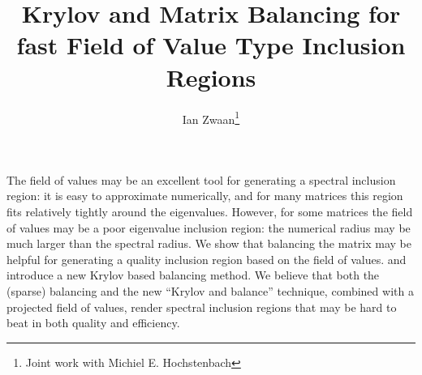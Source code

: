 \documentclass{article}
\title{Krylov and Matrix Balancing for fast Field of Value Type Inclusion Regions}
\author{Ian Zwaan\thanks{Joint work with Michiel E. Hochstenbach}}
\affil{PhD student at TU/e}
\date{}
\begin{document}
\maketitle
\setcounter{page}{7}
\vspace{-1cm}
The field of values may be an excellent tool for generating a spectral
inclusion region: it is easy to approximate numerically, and for many
matrices this region fits relatively tightly around the eigenvalues.
However, for some matrices the field of values may be a poor eigenvalue
inclusion region: the numerical radius may be much larger than the
spectral radius. We show that balancing the matrix may be helpful for
generating a quality inclusion region based on the field of values. and
introduce a new Krylov based balancing method. We believe that both the
(sparse) balancing and the new ``Krylov and balance'' technique,
combined with a projected field of values, render spectral inclusion
regions that may be hard to beat in both quality and efficiency.
\end{document}
